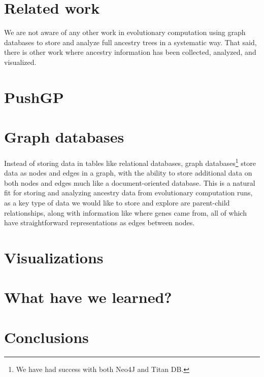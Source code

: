 \section{Related work}
\label{sec:related}

We are not aware of any other work in evolutionary computation using graph
databases to store and analyze full ancestry trees in a systematic way. That
said, there is other work where ancestry information has been collected,
analyzed, and visualized.


\section{PushGP}
\label{sec:Push}


\section{Graph databases}
\label{sec:graph_DBs}

Instead of storing data in tables like relational databases, graph 
databases\footnote{We have had success with both Neo4J and Titan DB.} 
store data as nodes and edges in a graph, with the ability to store additional
data on both nodes and edges much like a document-oriented database.
This is a natural fit for storing and analyzing ancestry data from evolutionary
computation runs, as a key type of data we would like to store and explore
are parent-child relationships, along with information like where genes came
from, all of which have straightforward representations as edges between
nodes.

\section{Visualizations}
\label{sec:visualizations}

\section{What have we learned?}
\label{sec:learned}

\section{Conclusions}
\label{sec:conclusions}

